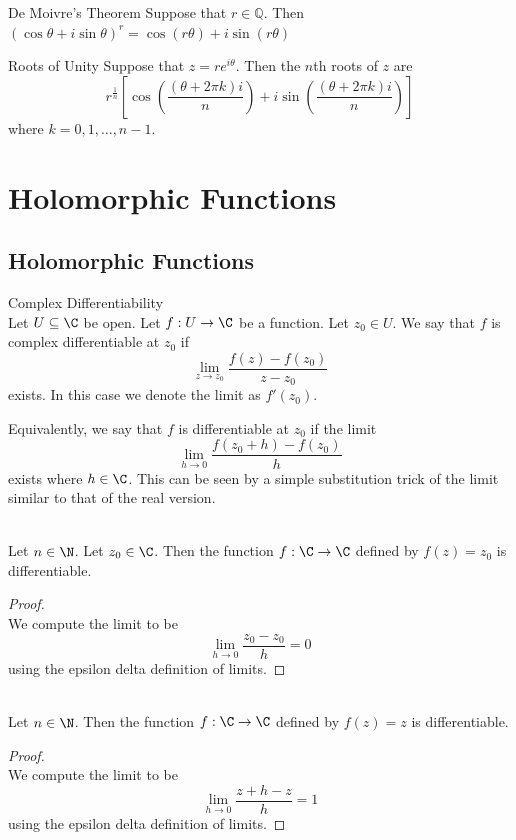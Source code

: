 \documentclass[a4paper]{article}
\begin{document}
\begin{thm}{De Moivre's Theorem}{} Suppose that $r\in\mathbb{Q}$. Then $(\cos{\theta}+i\sin{\theta})^r=\cos{(r\theta)}+i\sin{(r\theta)}$
\end{thm}

\begin{thm}{Roots of Unity}{} Suppose that $z=re^{i\theta}$. Then the $n$th roots of $z$ are $$r^{\frac{1}{n}}\left[\cos{\left(\frac{(\theta+2\pi k)i}{n}\right)}+i\sin{\left(\frac{(\theta+2\pi k)i}{n}\right)}\right]$$ where $k=0,1,\dots,n-1$. 
\end{thm}

\pagebreak
\section{Holomorphic Functions}
\subsection{Holomorphic Functions}
\begin{defn}{Complex Differentiability}{}\\
Let $U\subseteq\C$ be open. Let $f:U\to\C$ be a function. Let $z_0\in U$. We say that $f$ is complex differentiable at $z_0$ if $$\lim_{z\to z_0}\frac{f(z)-f(z_0)}{z-z_0}$$ exists. In this case we denote the limit as $f'(z_0)$. 
\end{defn}

Equivalently, we say that $f$ is differentiable at $z_0$ if the limit $$\lim_{h\to 0}\frac{f(z_0+h)-f(z_0)}{h}$$ exists where $h\in\C$. This can be seen by a simple substitution trick of the limit similar to that of the real version. 

\begin{eg}{}{}\\
Let $n\in\N$. Let $z_0\in\C$. Then the function $f:\C\to\C$ defined by $f(z)=z_0$ is differentiable. 
\begin{proof}\\
We compute the limit to be $$\lim_{h\to 0}\frac{z_0-z_0}{h}=0$$ using the epsilon delta definition of limits. 
\end{proof}
\end{eg}

\begin{eg}{}{}\\
Let $n\in\N$. Then the function $f:\C\to\C$ defined by $f(z)=z$ is differentiable. 
\begin{proof}\\
We compute the limit to be $$\lim_{h\to 0}\frac{z+h-z}{h}=1$$ using the epsilon delta definition of limits. 
\end{proof}
\end{eg}
\end{document}

